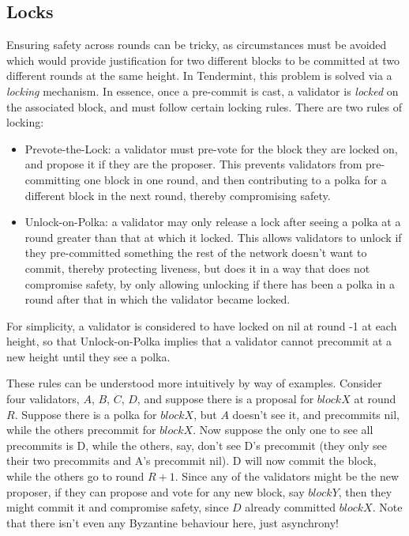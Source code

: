 \subsection{Locks}

Ensuring safety across rounds can be tricky, 
as circumstances must be avoided which would provide justification for two different blocks to be committed at two different rounds at the same height.
In Tendermint, this problem is solved via a \emph{locking} mechanism.
In essence, once a pre-commit is cast, a validator is \emph{locked} on the associated block, and must follow certain locking rules.
There are two rules of locking:

\begin{itemize}
\item{Prevote-the-Lock: a validator must pre-vote for the block they are locked on,
	and propose it if they are the proposer.	
	This prevents validators from pre-committing one block in one round, 
	and then contributing to a polka for a different block in the next round, 
	thereby compromising safety.}
\item{Unlock-on-Polka: a validator may only release a lock after seeing a polka at a round greater than that at which it locked.
	This allows validators to unlock if they pre-committed something the rest of the network doesn't want to commit,
	thereby protecting liveness, but does it in a way that does not compromise safety,
	by only allowing unlocking if there has been a polka in a round after that in which the validator became locked.}
\end{itemize}


For simplicity, a validator is considered to have locked on nil at round -1 at each height, 
so that Unlock-on-Polka implies that a validator cannot precommit at a new height until they see a polka.

These rules can be understood more intuitively by way of examples. 
Consider four validators, $A$, $B$, $C$, $D$, and suppose there is a proposal for $blockX$ at round $R$. 
Suppose there is a polka for $blockX$, 
but $A$ doesn't see it, and precommits nil, 
while the others precommit for $blockX$.
Now suppose the only one to see all precommits is D, 
while the others, say, don't see D's precommit (they only see their two precommits and A's precommit nil).
D will now commit the block, while the others go to round $R+1$.
Since any of the validators might be the new proposer, 
if they can propose and vote for any new block, say $blockY$, 
then they might commit it and compromise safety, since $D$ already committed $blockX$.
Note that there isn't even any Byzantine behaviour here, just asynchrony!

